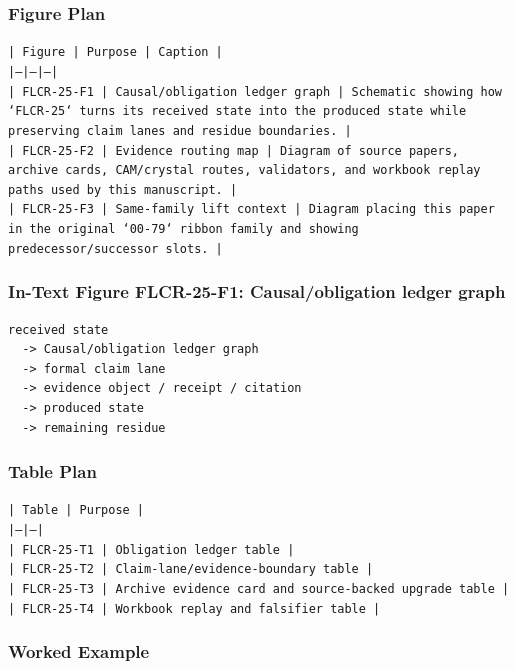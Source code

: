 \documentclass[11pt]{article}
\begin{document}
\subsubsection*{Figure Plan}

\noindent\texttt{| Figure | Purpose | Caption |}\\
\noindent\texttt{|---|---|---|}\\
\noindent\texttt{| FLCR-25-F1 | Causal/obligation ledger graph | Schematic showing how `FLCR-25` turns its received state into the produced state while preserving claim lanes and residue boundaries. |}\\
\noindent\texttt{| FLCR-25-F2 | Evidence routing map | Diagram of source papers, archive cards, CAM/crystal routes, validators, and workbook replay paths used by this manuscript. |}\\
\noindent\texttt{| FLCR-25-F3 | Same-family lift context | Diagram placing this paper in the original `00-79` ribbon family and showing predecessor/successor slots. |}\\

\subsubsection*{In-Text Figure FLCR-25-F1: Causal/obligation ledger graph}

\begin{verbatim}
received state
  -> Causal/obligation ledger graph
  -> formal claim lane
  -> evidence object / receipt / citation
  -> produced state
  -> remaining residue
\end{verbatim}

\subsubsection*{Table Plan}

\noindent\texttt{| Table | Purpose |}\\
\noindent\texttt{|---|---|}\\
\noindent\texttt{| FLCR-25-T1 | Obligation ledger table |}\\
\noindent\texttt{| FLCR-25-T2 | Claim-lane/evidence-boundary table |}\\
\noindent\texttt{| FLCR-25-T3 | Archive evidence card and source-backed upgrade table |}\\
\noindent\texttt{| FLCR-25-T4 | Workbook replay and falsifier table |}\\

\subsubsection*{Worked Example}
\end{document}

